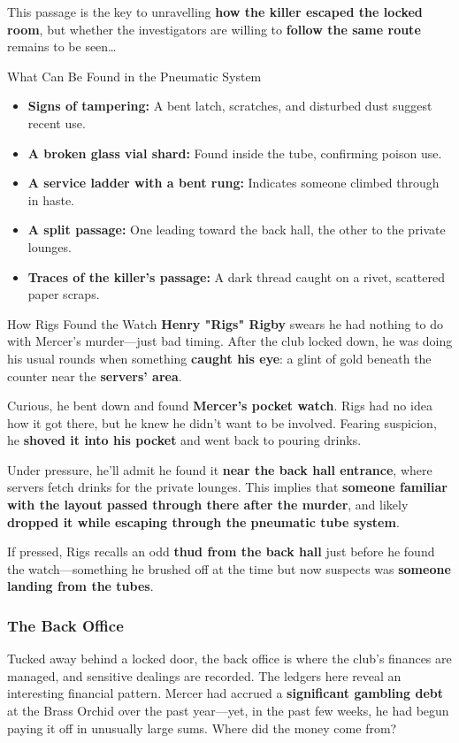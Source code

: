 This passage is the key to unravelling \textbf{how the killer escaped the locked room}, but whether the investigators are willing to \textbf{follow the same route} remains to be seen…  

\begin{CommentBox}{What Can Be Found in the Pneumatic System}  
	\begin{itemize}
		\item \textbf{Signs of tampering:} A bent latch, scratches, and disturbed dust suggest recent use.
		\item \textbf{A broken glass vial shard:} Found inside the tube, confirming poison use.
		\item \textbf{A service ladder with a bent rung:} Indicates someone climbed through in haste.
		\item \textbf{A split passage:} One leading toward the back hall, the other to the private lounges.
		\item \textbf{Traces of the killer’s passage:} A dark thread caught on a rivet, scattered paper scraps.
	\end{itemize}
\end{CommentBox}


\begin{Example}{How Rigs Found the Watch}
	\textbf{Henry "Rigs" Rigby} swears he had nothing to do with Mercer’s murder—just bad timing. After the club locked down, he was doing his usual rounds when something \textbf{caught his eye}: a glint of gold beneath the counter near the \textbf{servers’ area}.

	Curious, he bent down and found \textbf{Mercer’s pocket watch}. Rigs had no idea how it got there, but he knew he didn’t want to be involved. Fearing suspicion, he \textbf{shoved it into his pocket} and went back to pouring drinks.
	
	Under pressure, he’ll admit he found it \textbf{near the back hall entrance}, where servers fetch drinks for the private lounges. This implies that \textbf{someone familiar with the layout passed through there after the murder}, and likely \textbf{dropped it while escaping through the pneumatic tube system}.
	
	If pressed, Rigs recalls an odd \textbf{thud from the back hall} just before he found the watch—something he brushed off at the time but now suspects was \textbf{someone landing from the tubes}.
\end{Example}  

\newcolumn

\subsubsection{The Back Office}  
Tucked away behind a locked door, the back office is where the club’s finances are managed, and sensitive dealings are recorded. The ledgers here reveal an interesting financial pattern. Mercer had accrued a \textbf{significant gambling debt} at the Brass Orchid over the past year—yet, in the past few weeks, he had begun paying it off in unusually large sums. Where did the money come from?  

